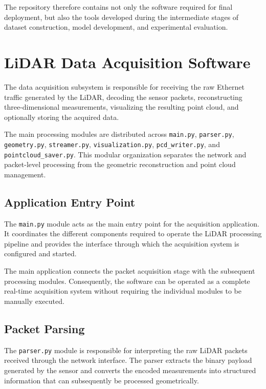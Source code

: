 The repository therefore contains not only the software required for final deployment, but also the tools developed during the intermediate stages of dataset construction, model development, and experimental evaluation.

\section{LiDAR Data Acquisition Software}
\label{sec:software_data_acquisition}

The data acquisition subsystem is responsible for receiving the raw Ethernet traffic generated by the LiDAR, decoding the sensor packets, reconstructing three-dimensional measurements, visualizing the resulting point cloud, and optionally storing the acquired data.

The main processing modules are distributed across \texttt{main.py}, \texttt{parser.py}, \texttt{geometry.py}, \texttt{streamer.py}, \texttt{visualization.py}, \texttt{pcd\_writer.py}, and \texttt{pointcloud\_saver.py}. This modular organization separates the network and packet-level processing from the geometric reconstruction and point cloud management.

\subsection{Application Entry Point}

The \texttt{main.py} module acts as the main entry point for the acquisition application. It coordinates the different components required to operate the LiDAR processing pipeline and provides the interface through which the acquisition system is configured and started.

The main application connects the packet acquisition stage with the subsequent processing modules. Consequently, the software can be operated as a complete real-time acquisition system without requiring the individual modules to be manually executed.

\subsection{Packet Parsing}

The \texttt{parser.py} module is responsible for interpreting the raw LiDAR packets received through the network interface. The parser extracts the binary payload generated by the sensor and converts the encoded measurements into structured information that can subsequently be processed geometrically.

